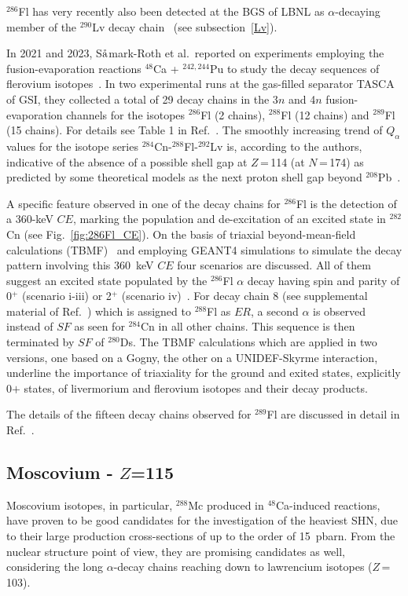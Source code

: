 $^{286}$Fl has very recently also been detected at the BGS of LBNL as $\alpha$-decaying member of the $^{290}$Lv decay chain~\cite{Gates2024} (see subsection~\ref{Lv}).

In 2021 and 2023, S${\mathring{\rm a}}$mark-Roth et al.~reported on experiments employing the fusion-evaporation reactions $^{48}$Ca + $^{242,244}$Pu to study the decay sequences of flerovium isotopes~\cite{Samark-Roth2021,Samark-Roth2023}.
In two experimental runs at the gas-filled separator TASCA of GSI, they collected a total of 29 decay chains in the 3$n$ and 4$n$ fusion-evaporation channels for the isotopes $^{286}$Fl (2 chains), $^{288}$Fl (12 chains) and $^{289}$Fl (15 chains). 
For details see Table 1 in Ref.~\cite{Samark-Roth2023}.
The smoothly increasing trend of $Q_\alpha$ values for the isotope series $^{284}$Cn-$^{288}$Fl-$^{292}$Lv is, according to the authors, indicative of the absence of a possible shell gap at $Z$\,=\,114 (at $N$\,=\,174) as predicted by some theoretical models as the next proton shell gap beyond $^{208}$Pb~\cite{Samark-Roth2021}.

A specific feature observed in one of the decay chains for $^{286}$Fl is the detection of a 360-keV $CE$, marking the population and de-excitation of an excited state in $^{282}$Cn (see Fig.~\ref{fig:286Fl_CE}). 
On the basis of triaxial beyond-mean-field calculations (TBMF)~\cite{Egido2020,Egido2021} and employing GEANT4 simulations to simulate the decay pattern involving this 360~keV $CE$ four scenarios are discussed. 
All of them suggest an excited state populated by the $^{286}$Fl $\alpha$ decay having spin and parity of 0$^+$ (scenario i-iii) or 2$^+$ (scenario iv)~\cite{Samark-Roth2023}.
For decay chain 8 (see supplemental material of Ref.~\cite{Samark-Roth2021}) which is assigned to $^{288}$Fl as $ER$, a second $\alpha$ is observed instead of $SF$ as seen for $^{284}$Cn in all other chains. 
This sequence is then terminated by $SF$ of  $^{280}$Ds.
The TBMF calculations which are applied in two versions, one based on a Gogny, the other on a UNIDEF-Skyrme interaction, underline the importance of triaxiality for the ground and exited states, explicitly 0$+$ states, of livermorium and flerovium isotopes and their decay products.

The details of the fifteen decay chains observed for $^{289}$Fl are discussed in detail in Ref.~\cite{Cox2023}.\\


\subsection{Moscovium - $Z$=115}\label{Mc}
Moscovium isotopes, in particular, $^{288}$Mc produced in $^{48}$Ca-induced reactions, have proven to be good candidates for the investigation of the heaviest SHN, due to their large production cross-sections of up to the order of 15~pbarn.
From the nuclear structure point of view, they are promising candidates as well, considering the long $\alpha$-decay chains reaching down to lawrencium isotopes ($Z$\,=\,103).\\

